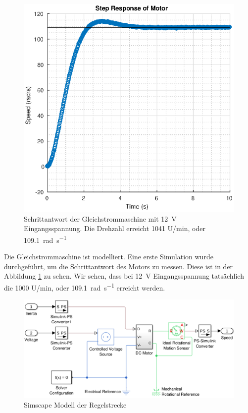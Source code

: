 \begin{figure}
    \centering
    \includegraphics[width=\imagewidth]{images/motor_step}
    \caption{Schrittantwort der Gleichstrommaschine mit \SI{12}{\volt} Eingangsspannung. Die Drehzahl erreicht 1041 U/min, oder \SI{109.1}{\radian\per\second}}
    \label{fig:motor_step}
\end{figure}

Die  Gleichstrommaschine  ist   modelliert.   Eine   erste   Simulation  wurde
durchgef\"uhrt, um die Schrittantwort des Motors zu messen. Diese ist  in  der
Abbildung \ref{fig:motor_step} zu sehen. Wir  sehen,  dass  bei \SI{12}{\volt}
Eingangsspannung      tats\"achlich      die      1000       U/min,       oder
\SI{109.1}{\radian\per\second} erreicht werden.

\begin{figure}
    \centering
    \includegraphics[width=\imagewidth]{images/model_plant}
    \caption{Simscape Modell der Regelstrecke}
    \label{fig:model_plant}
\end{figure}

